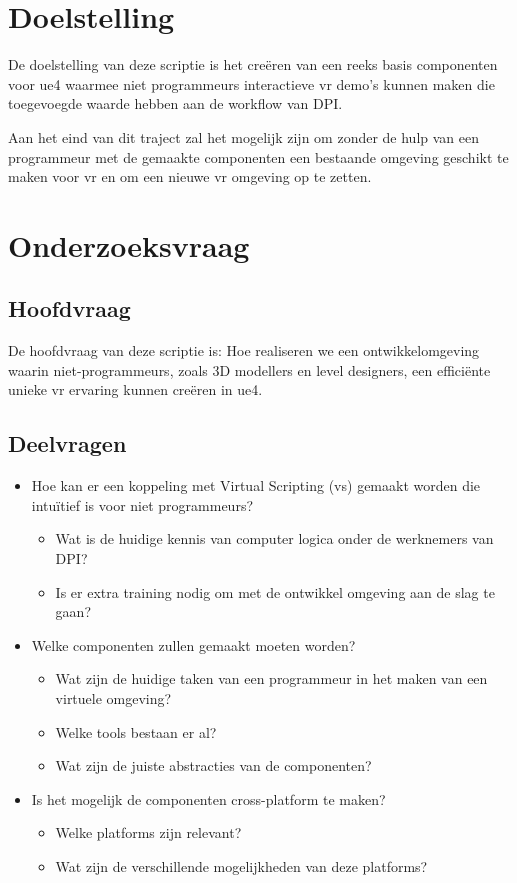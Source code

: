 \section{Doelstelling}

De doelstelling van deze scriptie is het creëren van een reeks basis componenten voor \gls{ue4} waarmee niet programmeurs interactieve \gls{vr} demo’s kunnen maken die toegevoegde waarde hebben aan de workflow van DPI.

Aan het eind van dit traject zal het mogelijk zijn om zonder de hulp van een programmeur met de gemaakte componenten een bestaande omgeving geschikt te maken voor \gls{vr} en om een nieuwe \gls{vr} omgeving op te zetten.

\section{Onderzoeksvraag}

\subsection{Hoofdvraag}

De hoofdvraag van deze scriptie is: Hoe realiseren we een ontwikkelomgeving waarin niet-programmeurs, zoals 3D modellers en level designers, een efficiënte unieke \gls{vr} ervaring kunnen creëren in \gls{ue4}.

\subsection{Deelvragen}

\begin{itemize}  
\item Hoe kan er een koppeling met Virtual Scripting (\gls{vs}) gemaakt worden die intuïtief is voor niet programmeurs? 
	\begin{itemize}
	\item Wat is de huidige kennis van computer logica onder de werknemers van DPI?
	\item Is er extra training nodig om met de ontwikkel omgeving aan de slag te gaan?
	\end{itemize}
\item Welke componenten zullen gemaakt moeten worden?
	\begin{itemize}
	\item Wat zijn de huidige taken van een programmeur in het maken van een virtuele omgeving?
	\item Welke tools bestaan er al?
	\item Wat zijn de juiste abstracties van de componenten? 
	\end{itemize}
\item Is het mogelijk de componenten cross-platform te maken?
	\begin{itemize}
	\item Welke platforms zijn relevant?
	\item Wat zijn de verschillende mogelijkheden van deze platforms?
	\end{itemize}
\end{itemize}

